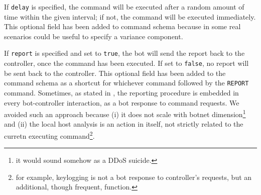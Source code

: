 If \texttt{delay} is specified, the command will be executed after a random amount of time within the given interval; if not, the command will be executed immediately. This optional field has been added to command schema because in some real scenarios could be useful to specify a variance component.

If \texttt{report} is specified and set to \texttt{true}, the bot will send the report back to the controller, once the command has been executed. If set to \texttt{false}, no report will be sent back to the controller. This optional field has been added to the command schema as a shortcut for whichever command followed by the \texttt{REPORT} command. Sometimes, as stated in \cite{build-your-own-botnet}, the reporting procedure is embedded in every bot-controller interaction, as a bot response to command requests. We avoided such an approach because (i) it does not scale with botnet dimension\footnote{it would sound somehow as a DDoS suicide.} and (ii) the local host analysis is an action in itself, not strictly related to the curretn executing command\footnote{for example, keylogging is not a bot response to controller's requests, but an additional, though frequent, function.}.

